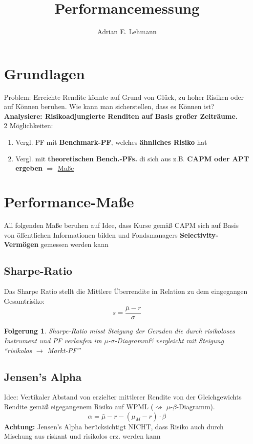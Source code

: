 \documentclass[a4paper]{article}
\title{Performancemessung}
\author{Adrian E. Lehmann}
\theoremstyle{break}
\newcommand{\ms}{$\mu$-$\sigma$}
\newcommand{\msd}{\ms-Diagramm}
\newcommand{\mbd}{$\mu$-$\beta$-Diagramm}
\newtheorem{der}{Folgerung}[section]
\begin{document}
        \maketitle
        \tableofcontents
        \newpage
        
\section{Grundlagen}
    Problem: Erreichte Rendite könnte auf Grund von Glück, zu hoher Risiken oder auf Können beruhen. Wie kann man sicherstellen, dass es Können ist?
    \textbf{Analysiere: Risikoadjungierte Renditen auf Basis großer Zeiträume.}\\

2 Möglichkeiten:\\
\begin{enumerate}
    \item Vergl. PF mit \textbf{Benchmark-PF}, welches \textbf{ähnliches Risiko} hat
    \item Vergl. mit \textbf{theoretischen Bench.-PFs.} di sich aus z.B. \textbf{CAPM oder APT ergeben} $\Rightarrow$ \hyperref[perf]{Maße}
\end{enumerate}

\section{Performance-Maße}
\label{perf}
    All folgenden Maße beruhen auf Idee, dass Kurse gemäß CAPM sich auf Basis von öffentlichen Informationen bilden und Fondsmanagers \textbf{Selectivity-Vermögen} gemessen werden kann
\subsection{Sharpe-Ratio}
    Das Sharpe Ratio stellt die Mittlere Überrendite in Relation zu dem eingegangen Gesamtrisiko:
    $$s = \frac{\bar{\mu} - r}{\sigma}$$
    \begin{der}
        Sharpe-Ratio misst Steigung der Geraden die durch risikoloses Instrument und PF verlaufen im \msd \& vergleicht mit Steigung ``risikolos $\rightarrow$ Markt-PF''
    \end{der}
\subsection{Jensen's Alpha}
    Idee: Vertikaler Abstand von erzielter mittlerer Rendite von der Gleichgewichts Rendite gemäß eigegangenem Risiko auf WPML ($\rightsquigarrow$ \mbd).
    $$\alpha = \bar{\mu} - r - (\mu_M - r)  \cdot \beta$$ 
    \textbf{Achtung:} Jensen's Alpha berücksichtigt NICHT, dass Risiko auch durch Mischung aus riskant und risikolos erz. werden kann
\end{document}

